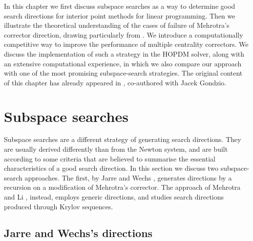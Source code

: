 
%
%
\label{ch:Correctors}

In this chapter we first discuss subspace searches as a way 
to determine good search directions for interior point methods
for linear programming.
Then we illustrate the theoretical understanding of 
the cases of failure of Mehrotra's corrector direction,
drawing particularly from \cite{Cartis04,Cartis05}.
We introduce a computationally competitive way
to improve the performance of multiple centrality correctors.
We discuss the implementation of such a strategy in the HOPDM solver,
along with an extensive computational experience, in which
we also compare our approach with one of the most promising
subspace-search strategies.
The original content of this chapter has already appeared 
in \cite{ColomboGondzio05}, co-authored with Jacek Gondzio.


%
%
\section{Subspace searches}

Subspace searches are a different strategy of generating search 
directions. 
They are usually derived differently than from the Newton system, and 
are built according to some criteria that are believed to summarise
the essential characteristics of a good search direction.
In this section we discuss two subspace-search approaches. 
The first, by Jarre and Wechs \cite{JarreWechs}, generates directions
by a recursion on a modification of Mehrotra's corrector.
The approach of Mehrotra and Li \cite{MehrotraLi}, instead, 
employs generic directions, and studies search directions
produced through Krylov sequences.

%
%
\subsection{Jarre and Wechs's directions}

